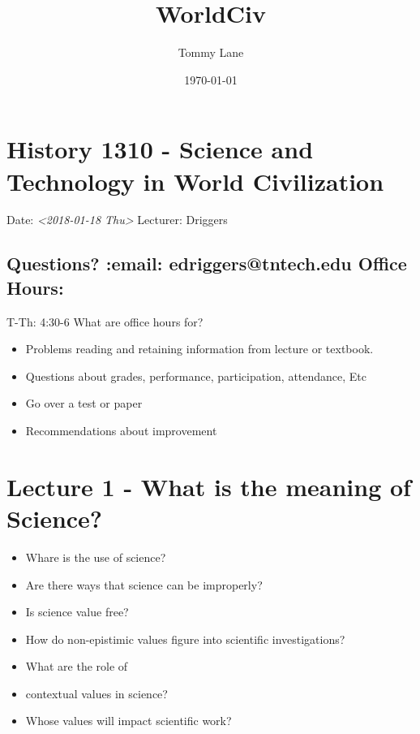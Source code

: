 \documentclass[11pt]{article}
\author{Tommy Lane}
\date{\today}
\title{WorldCiv}
\begin{document}
\maketitle
\tableofcontents



\section{History 1310 - Science and Technology in World Civilization}
\label{sec-1}

Date: \textit{<2018-01-18 Thu>} Lecturer: Driggers

\subsection{Questions? :email: edriggers@tntech.edu \textbf{Office Hours}:}
\label{sec-1-1}
T-Th: 4:30-6
What are office hours for? 
\begin{itemize}
\item Problems reading and retaining information from lecture or textbook.

\item Questions about grades, performance, participation, attendance, Etc

\item Go over a test or paper

\item Recommendations about improvement
\end{itemize}

\section{Lecture 1 - What is the meaning of Science?}
\label{sec-2}

\begin{itemize}
\item Whare is the use of science?

\item Are there ways that science can be improperly?

\item Is science value free?

\item How do non-epistimic values figure into scientific investigations?

\item What are the role of

\item contextual values in science?

\item Whose values will impact scientific work?
\end{itemize}
\end{document}
